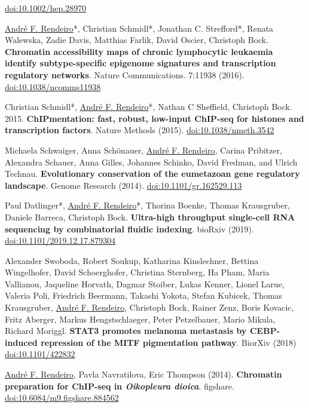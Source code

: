 \documentclass[11pt,a4paper,roman]{moderncv} %
\begin{document}
\begin{etaremune}[leftmargin=1.0cm, itemindent=0pt, topsep=10pt, itemsep=2pt, partopsep=0pt, parsep=0pt]
        \href{https://dx.doi.org/10.1002/hep.28970}{doi:10.1002/hep.28970}
        \item \underline{André F. Rendeiro}*, Christian Schmidl*, Jonathan C. Strefford*, Renata Walewska, Zadie Davis, Matthias Farlik, David Oscier, Christoph Bock. \textbf{Chromatin accessibility maps of chronic lymphocytic leukaemia identify subtype-specific epigenome signatures and transcription regulatory networks}. Nature Communications. 7:11938 (2016).
        \href{https://dx.doi.org/10.1038/ncomms11938}{doi:10.1038/ncomms11938}
        \item Christian Schmidl*, \underline{André F. Rendeiro}*,  Nathan C Sheffield, Christoph Bock. 2015. \textbf{ChIPmentation: fast, robust, low-input ChIP-seq for histones and transcription factors}. Nature Methods (2015).
        \href{https://dx.doi.org/10.1038/nmeth.3542}{doi:10.1038/nmeth.3542}
        \item Michaela Schwaiger, Anna Schönauer, \underline{André F. Rendeiro}, Carina Pribitzer, Alexandra Schauer, Anna Gilles, Johannes Schinko, David Fredman, and Ulrich Technau. \textbf{Evolutionary conservation of the eumetazoan gene regulatory landscape}. Genome Research (2014).
        \href{https://dx.doi.org/10.1101/gr.162529.113}{doi:10.1101/gr.162529.113}
        \end{etaremune}

        \begin{etaremune}[leftmargin=1.0cm, itemindent=0pt, topsep=10pt, itemsep=2pt, partopsep=0pt, parsep=0pt]
        \item Paul Datlinger*, \underline{André F. Rendeiro}*, Thorina Boenke, Thomas Krausgruber, Daniele Barreca, Christoph Bock. \textbf{Ultra-high throughput single-cell RNA sequencing by combinatorial fluidic indexing}. bioRxiv (2019). \href{https://dx.doi.org/10.1101/2019.12.17.879304}{doi:10.1101/2019.12.17.879304}
        \item Alexander Swoboda, Robert Soukup, Katharina Kinslechner, Bettina Wingelhofer, David Schoerghofer, Christina Sternberg, Ha Pham, Maria Vallianou, Jaqueline Horvath, Dagmar Stoiber, Lukas Kenner, Lionel Larue, Valeria Poli, Friedrich Beermann, Takashi Yokota, Stefan Kubicek, Thomas Krausgruber, \underline{André F. Rendeiro}, Christoph Bock, Rainer Zenz, Boris Kovacic, Fritz Aberger, Markus Hengstschlaeger, Peter Petzelbauer, Mario Mikula, Richard Moriggl. \textbf{STAT3 promotes melanoma metastasis by CEBP-induced repression of the MITF pigmentation pathway}. BiorXiv (2018) \href{https://dx.doi.org/ 10.1101/422832}{doi:10.1101/422832}
        \item \underline{André F. Rendeiro}, Pavla  Navratilova, Eric Thompson (2014). \textbf{Chromatin preparation for ChIP-seq in \textit{Oikopleura dioica}}. figshare. \href{https://doi.org/10.6084/m9.figshare.884562}{doi:10.6084/m9.figshare.884562}
        \end{etaremune}
\end{document}

